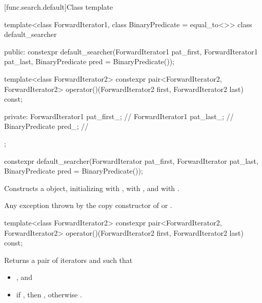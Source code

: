 [func.search.default]{Class template }

%
\begin{codeblock}
template<class ForwardIterator1, class BinaryPredicate = equal_to<>>
  class default_searcher {
  public:
    constexpr default_searcher(ForwardIterator1 pat_first, ForwardIterator1 pat_last,
                               BinaryPredicate pred = BinaryPredicate());

    template<class ForwardIterator2>
      constexpr pair<ForwardIterator2, ForwardIterator2>
        operator()(ForwardIterator2 first, ForwardIterator2 last) const;

  private:
    ForwardIterator1 pat_first_;        // \expos
    ForwardIterator1 pat_last_;         // \expos
    BinaryPredicate pred_;              // \expos
  };
\end{codeblock}

%
\begin{itemdecl}
constexpr default_searcher(ForwardIterator pat_first, ForwardIterator pat_last,
                           BinaryPredicate pred = BinaryPredicate());
\end{itemdecl}

\begin{itemdescr}
\pnum
\effects
Constructs a  object, initializing 
with , \mbox{} with , and
 with .

\pnum
\throws
Any exception thrown by the copy constructor of  or
.
\end{itemdescr}

%
\begin{itemdecl}
template<class ForwardIterator2>
  constexpr pair<ForwardIterator2, ForwardIterator2>
    operator()(ForwardIterator2 first, ForwardIterator2 last) const;
\end{itemdecl}

\begin{itemdescr}
\pnum
\effects
Returns a pair of iterators  and  such that
\begin{itemize}
\item {}, and
\item if , then ,
otherwise .
\end{itemize}
\end{itemdescr}

